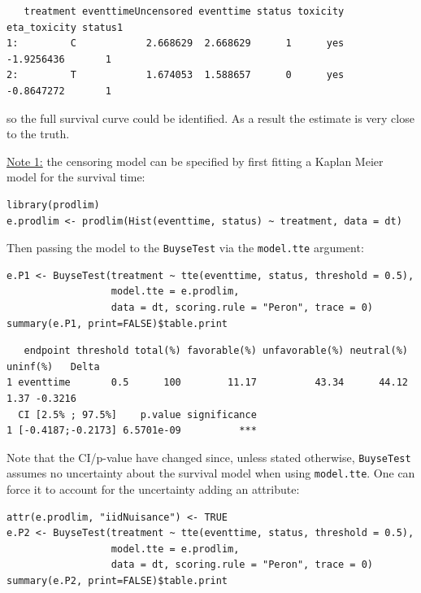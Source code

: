 \documentclass[12pt]{article}
\begin{document}
\begin{verbatim}
   treatment eventtimeUncensored eventtime status toxicity eta_toxicity status1
1:         C            2.668629  2.668629      1      yes   -1.9256436       1
2:         T            1.674053  1.588657      0      yes   -0.8647272       1
\end{verbatim}

so the full survival curve could be identified. As a result the estimate is very close to the
truth. 

\bigskip

\uline{Note 1:} the censoring model can be specified by first fitting a
Kaplan Meier model for the survival time:
\lstset{language=r,label= ,caption= ,captionpos=b,numbers=none}
\begin{lstlisting}
library(prodlim)
e.prodlim <- prodlim(Hist(eventtime, status) ~ treatment, data = dt)
\end{lstlisting}

Then passing the model to the \texttt{BuyseTest} via the \texttt{model.tte} argument:
\lstset{language=r,label= ,caption= ,captionpos=b,numbers=none}
\begin{lstlisting}
e.P1 <- BuyseTest(treatment ~ tte(eventtime, status, threshold = 0.5),
                  model.tte = e.prodlim,
                  data = dt, scoring.rule = "Peron", trace = 0)
summary(e.P1, print=FALSE)$table.print
\end{lstlisting}

\begin{verbatim}
   endpoint threshold total(%) favorable(%) unfavorable(%) neutral(%) uninf(%)   Delta
1 eventtime       0.5      100        11.17          43.34      44.12     1.37 -0.3216
  CI [2.5% ; 97.5%]    p.value significance
1 [-0.4187;-0.2173] 6.5701e-09          ***
\end{verbatim}


Note that the CI/p-value have changed since, unless stated otherwise,
\texttt{BuyseTest} assumes no uncertainty about the survival model when using
\texttt{model.tte}. One can force it to account for the uncertainty adding an attribute:
\lstset{language=r,label= ,caption= ,captionpos=b,numbers=none}
\begin{lstlisting}
attr(e.prodlim, "iidNuisance") <- TRUE
e.P2 <- BuyseTest(treatment ~ tte(eventtime, status, threshold = 0.5),
                  model.tte = e.prodlim,
                  data = dt, scoring.rule = "Peron", trace = 0)
summary(e.P2, print=FALSE)$table.print
\end{lstlisting}
\end{document}
